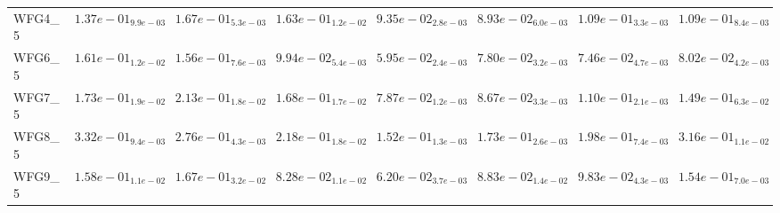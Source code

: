 \documentclass{article}
\begin{document}
\begin{landscape}
\begin{table}
\begin{scriptsize}
\begin{tabular}{llllllll}
WFG4\_5 & $  1.37e-01_{ 9.9e-03}$ & $  1.67e-01_{ 5.3e-03}$ & $  1.63e-01_{ 1.2e-02}$ & \cellcolor{gray25}$  9.35e-02_{ 2.8e-03}$ & \cellcolor{gray95}$  8.93e-02_{ 6.0e-03}$ & $  1.09e-01_{ 3.3e-03}$ & $  1.09e-01_{ 8.4e-03}$ \\
WFG6\_5 & $  1.61e-01_{ 1.2e-02}$ & $  1.56e-01_{ 7.6e-03}$ & $  9.94e-02_{ 5.4e-03}$ & \cellcolor{gray95}$  5.95e-02_{ 2.4e-03}$ & $  7.80e-02_{ 3.2e-03}$ & \cellcolor{gray25}$  7.46e-02_{ 4.7e-03}$ & $  8.02e-02_{ 4.2e-03}$ \\
WFG7\_5 & $  1.73e-01_{ 1.9e-02}$ & $  2.13e-01_{ 1.8e-02}$ & $  1.68e-01_{ 1.7e-02}$ & \cellcolor{gray95}$  7.87e-02_{ 1.2e-03}$ & \cellcolor{gray25}$  8.67e-02_{ 3.3e-03}$ & $  1.10e-01_{ 2.1e-03}$ & $  1.49e-01_{ 6.3e-02}$ \\
WFG8\_5 & $  3.32e-01_{ 9.4e-03}$ & $  2.76e-01_{ 4.3e-03}$ & $  2.18e-01_{ 1.8e-02}$ & \cellcolor{gray95}$  1.52e-01_{ 1.3e-03}$ & \cellcolor{gray25}$  1.73e-01_{ 2.6e-03}$ & $  1.98e-01_{ 7.4e-03}$ & $  3.16e-01_{ 1.1e-02}$ \\
WFG9\_5 & $  1.58e-01_{ 1.1e-02}$ & $  1.67e-01_{ 3.2e-02}$ & \cellcolor{gray25}$  8.28e-02_{ 1.1e-02}$ & \cellcolor{gray95}$  6.20e-02_{ 3.7e-03}$ & $  8.83e-02_{ 1.4e-02}$ & $  9.83e-02_{ 4.3e-03}$ & $  1.54e-01_{ 7.0e-03}$ \\
\hline
\end{tabular}
\end{scriptsize}
\end{table}


\end{landscape}
\end{document}
